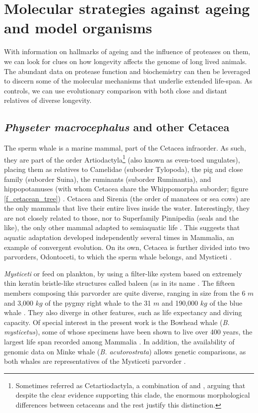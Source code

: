 \section{Molecular strategies against ageing and model organisms} \label{s_intro_models}

With information on hallmarks of ageing and the influence of proteases on them, we can look for clues on how longevity affects the genome of long lived animals.
The abundant data on protease function and biochemistry can then be leveraged to discern some of the molecular mechanisms that underlie extended life-span.
As controls, we can use evolutionary comparison with both close and distant relatives of diverse longevity.

\subsection{\textit{Physeter macrocephalus} and other Cetacea} \label{ss_intro_models_sperm_whale}

The sperm whale is a marine mammal, part of the Cetacea infraorder.
As such, they are part of the order Artiodactyla\footnote{Sometimes referred as Cetartiodactyla, a combination of  and , arguing that despite the clear evidence supporting this clade, the enormous morphological differences between cetaceans and the rest justify this distinction.} (also known as even-toed ungulates), placing them as relatives to Camelidae (suborder Tylopoda), the pig and close family (suborder Suina), the ruminants (suborder Ruminantia), and hippopotamuses (with whom Cetacea share the Whippomorpha suborder; figure \ref{f_cetacean_tree}) \cite{Agnarsson2008}.
Cetacea and Sirenia (the order of manatees or sea cows) are the only mammals that live their entire lives inside the water.
Interestingly, they are not closely related to those, nor to Superfamily Pinnipedia (seals and the like), the only other mammal adapted to semiaquatic life \cite{Arnason2007,Tabuce2008}.
This suggests that aquatic adaptation developed independently several times in Mammalia, an example of convergent evolution.
On its own, Cetacea is further divided into two parvorders, Odontoceti, to which the sperm whale belongs, and Mysticeti \cite{Mancia2018}.

\textsl{Mysticeti} or  feed on plankton, by using a filter-like system based on extremely thin keratin bristle-like structures called baleen (as in its  name \cite{Fordyce2018}.
The fifteen members composing this parvorder are quite diverse, ranging in size from the 6 $m$ and 3,000 $kg$ of the pygmy right whale to the 31 $m$ and 190,000 $kg$ of the blue whale \cite{Agnarsson2008,Wada2003}.
They also diverge in other features, such as life expectancy and diving capacity.
Of special interest in the present work is the Bowhead whale (\emph{B. mysticetus}), some of whose specimens have been shown to live over 400 years, the largest life span recorded among Mammalia \cite{Keane2015}.
In addition, the availability of genomic data on Minke whale (\emph{B. acutorostrata}) allows genetic comparisons, as both whales are representatives of the Mysticeti parvorder \cite{Yim2014c}.

